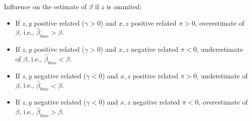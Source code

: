 \documentclass[10pt]{article}
\begin{document}
Influence on the estimate of $ \beta $ if $ z $ is ommited:
\begin{itemize}
		\item If $ z,y $ positive related ($ \gamma > 0 $) and $ x,z $ positive related $ \pi > 0 $,  overestimate of $ \beta $, i.e., $ \widehat{\beta}_{bias} > \beta $.
		\item If $ z,y $ positive related ($ \gamma > 0 $) and $ x,z $ negative related $ \pi < 0 $,  underestimate of $ \beta $, i.e., $ \widehat{\beta}_{bias} < \beta $.

		\item If $ z,y $ negative related ($ \gamma < 0 $) and $ x,z $ positive related $ \pi > 0 $,  understimate of $ \beta $, i.e., $ \widehat{\beta}_{bias} < \beta $.
		\item If $ z,y $ negative related ($ \gamma < 0 $) and $ x,z $ negative related $ \pi < 0 $,  overestimate of $ \beta $, i.e., $ \widehat{\beta}_{bias} > \beta $.
\end{itemize}






\end{document}

